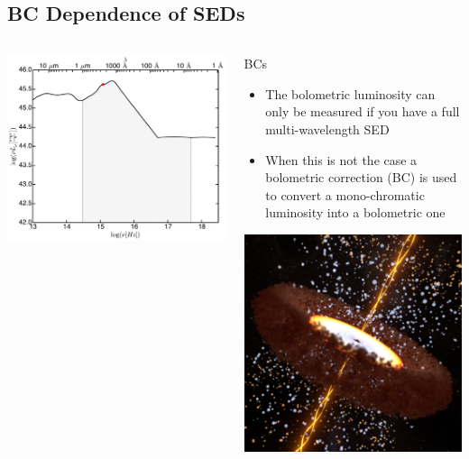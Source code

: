 \documentclass[landscape,9pt]{beamer}
\begin{document}
\subsection{BC Dependence of SEDs}
\begin{frame}
	\begin{columns}
	\begin{column}{.75\textwidth}
		\includegraphics[width=\textwidth]{../images/Talk/BC}
	\end{column}
	\begin{column}{.35\textwidth}
		\centering
		\begin{block}{BCs}
		\begin{itemize}
			\item The bolometric luminosity can only be measured if you have a full multi-wavelength SED
			\item When this is not the case a bolometric correction (BC) is used to convert a mono-chromatic luminosity into a bolometric one
		\end{itemize}
		\end{block}
		\includegraphics[width=.5\textwidth]{../images/Talk/agn_03}
	\end{column}
	\end{columns}
\end{frame}
\end{document}
